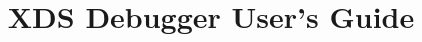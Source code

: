 \commonfalse

\FrameIsDeepfalse
\FrameToContentstrue

\newcommand{\VersionNumber}{1.1}
\newcommand{\BookName}{XDS Debugger User's Guide}
\ifonline\title{XDS Debugger User's Guide}\fi

\makeindex

